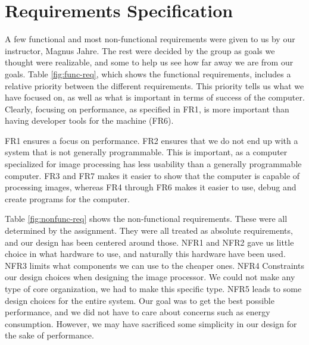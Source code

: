 \section{Requirements Specification}

 A few functional
and most non-functional requirements were given to us by our instructor, Magnus
Jahre. The rest were decided by the group as goals we thought were realizable, and
some to help us see how far away we are from our goals. Table
\ref{fig:func-req}, which shows the functional requirements, includes a relative
priority between the different requirements.  This priority tells us what we
have focused on, as well as what is important in terms of success of the
computer. Clearly, focusing on performance, as specified in {\sc FR1}, is more
important than having developer tools for the machine ({\sc FR6}).

{\sc FR1} ensures a focus on performance. {\sc FR2} ensures that we do not end
up with a system that is not generally programmable. This is important, as a
computer specialized for image processing has less usability than a generally
programmable computer. {\sc FR3} and {\sc FR7} makes it easier to show that the
computer is capable of processing images, whereas {\sc FR4} through {\sc FR6} makes it
easier to use, debug and create programs for the computer.



Table \ref{fig:nonfunc-req} shows the non-functional requirements. These were
all determined by the assignment. They were all treated as absolute requirements,
and our design has been centered around those. {\sc NFR1} and {\sc NFR2} gave us
little choice in what hardware to use, and naturally this hardware have been used. {\sc
  NFR3} limits what components we can use to the cheaper ones. {\sc NFR4} Constraints our
design choices when designing the image processor. We could not make any type of core
organization, we had to make this specific type. {\sc NFR5} leads to some
design choices for the entire system. Our goal was to get the best possible performance, and we did not
have to care about concerns such as energy consumption. 
However, we may have sacrificed some simplicity in our design for
the sake of performance.
